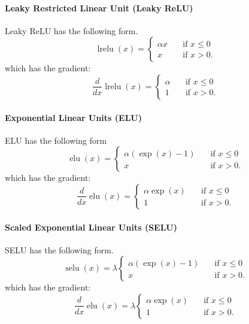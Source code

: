 \documentclass{article}
\DeclareMathOperator{\lrelu}{lrelu}
\DeclareMathOperator{\elu}{elu}
\DeclareMathOperator{\selu}{selu}
\begin{document}
\paragraph{Leaky Restricted Linear Unit (Leaky ReLU)}
Leaky ReLU \citep{Maas13rectifiernonlinearities} has the following form.
\begin{equation}
	\lrelu(x) = 
	\begin{cases} 
      \alpha x      & \quad \text{if } x \leq  0 \\
      x      & \quad \text{if } x > 0 .
    \end{cases} 
\end{equation}
which has the gradient:
\begin{equation}
  \frac{d}{dx} \lrelu(x) =
     \begin{cases} 
      \alpha      & \quad \text{if } x \leq  0 \\
      1       & \quad \text{if } x > 0 .
    \end{cases} 
\end{equation}

\paragraph{Exponential Linear Units (ELU)}
ELU\citep{2015arXiv151107289C} has the following form
\begin{equation}
	\elu(x) = 
	\begin{cases} 
      \alpha (\exp(x)-1)      & \quad \text{if } x \leq  0 \\
      x      & \quad \text{if } x > 0 .
    \end{cases} 
\end{equation}
which has the gradient:
\begin{equation}
  \frac{d}{dx} \elu(x) =
     \begin{cases} 
      \alpha \exp(x)     & \quad \text{if } x \leq  0 \\
      1       & \quad \text{if } x > 0 .
    \end{cases} 
\end{equation}


\paragraph{Scaled Exponential Linear Units (SELU)}
SELU \citep{2017arXiv170602515K} has the following form.
\begin{equation}
	\selu(x) = \lambda
	\begin{cases} 
      \alpha (\exp(x)-1)      & \quad \text{if } x \leq  0 \\
      x      & \quad \text{if } x > 0 .
    \end{cases} 
\end{equation}
which has the gradient:
\begin{equation}
  \frac{d}{dx} \elu(x) = \lambda
     \begin{cases} 
      \alpha \exp(x)     & \quad \text{if } x \leq  0 \\
      1       & \quad \text{if } x > 0 .
    \end{cases} 
\end{equation}
\end{document}
